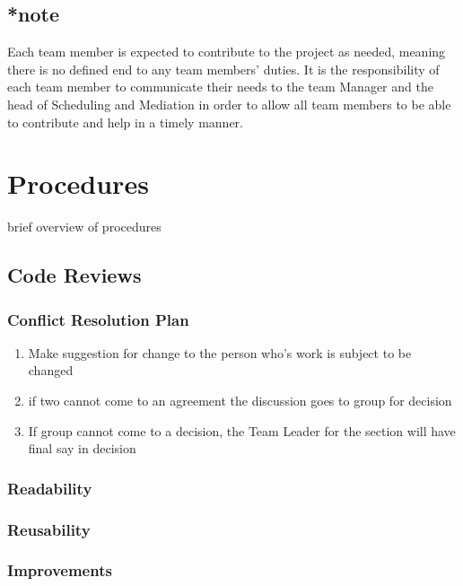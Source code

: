 \documentclass[11pt, titlepage]{article}
\begin{document}
     \subsection{*note}
     	Each team member is expected to contribute to the project as needed, meaning there is no defined end to any team members' duties.  It is the responsibility of each team member to communicate their needs to the team Manager and the head of Scheduling and Mediation in order to allow all team members to be able to contribute and help in a timely manner.
    \section{Procedures}
    	\tab brief overview of procedures
    \subsection{Code Reviews}
   		\subsubsection{Conflict Resolution Plan}
        
        \begin{enumerate}
		\item Make suggestion for change to the person who's work is subject to be 	changed
        \item if two cannot come to an agreement the discussion goes to group for 	decision
        \item If group cannot come to a decision, the Team Leader for the section will have final say in decision
		\end{enumerate}
    
    \subsubsection{Readability} 
    
    \subsubsection{Reusability}
    
    \subsubsection{Improvements}
    
\end{document}
